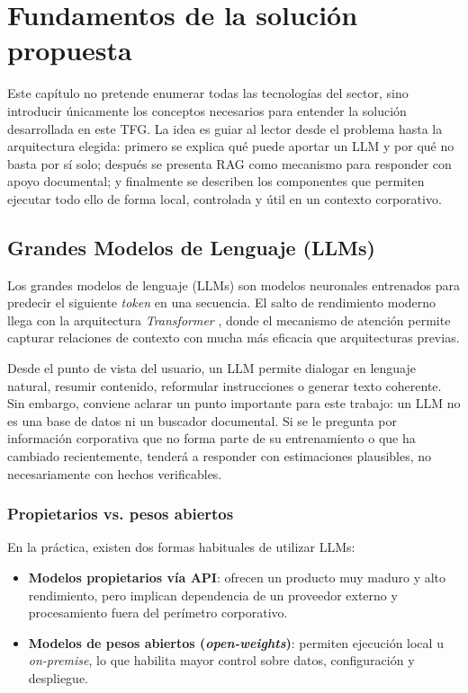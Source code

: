 \chapter{Fundamentos de la solución propuesta}
\label{cap:estado}

Este capítulo no pretende enumerar todas las tecnologías del sector, sino introducir únicamente los conceptos necesarios para entender la solución desarrollada en este TFG. La idea es guiar al lector desde el problema hasta la arquitectura elegida: primero se explica qué puede aportar un LLM y por qué no basta por sí solo; después se presenta RAG como mecanismo para responder con apoyo documental; y finalmente se describen los componentes que permiten ejecutar todo ello de forma local, controlada y útil en un contexto corporativo.

\section{Grandes Modelos de Lenguaje (LLMs)}

Los grandes modelos de lenguaje (LLMs) son modelos neuronales entrenados para predecir el siguiente \textit{token} en una secuencia. El salto de rendimiento moderno llega con la arquitectura \textit{Transformer} \cite{vaswani2017attention}, donde el mecanismo de atención permite capturar relaciones de contexto con mucha más eficacia que arquitecturas previas.

Desde el punto de vista del usuario, un LLM permite dialogar en lenguaje natural, resumir contenido, reformular instrucciones o generar texto coherente. Sin embargo, conviene aclarar un punto importante para este trabajo: un LLM no es una base de datos ni un buscador documental. Si se le pregunta por información corporativa que no forma parte de su entrenamiento o que ha cambiado recientemente, tenderá a responder con estimaciones plausibles, no necesariamente con hechos verificables.

\subsection{Propietarios vs. pesos abiertos}

En la práctica, existen dos formas habituales de utilizar LLMs:

\begin{itemize}
    \item \textbf{Modelos propietarios vía API}: ofrecen un producto muy maduro y alto rendimiento, pero implican dependencia de un proveedor externo y procesamiento fuera del perímetro corporativo.
    \item \textbf{Modelos de pesos abiertos (\textit{open-weights})}: permiten ejecución local u \textit{on-premise}, lo que habilita mayor control sobre datos, configuración y despliegue.
\end{itemize}

